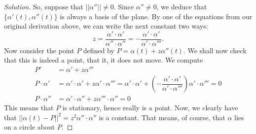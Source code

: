 \documentclass[Shifrin_Solutions_Spring_2015]{subfiles}
\begin{document}
\begin{proof}[Solution]
So, suppose that $||\alpha''||\neq 0$. Since $\alpha'' \neq 0$, we deduce that $\{ \alpha'(t), \alpha''(t) \}$ is always a basis of the plane.
By one of the equations from our original derivation above, we can write the next constant two ways:
\[
z = \dfrac{\alpha'\cdot \alpha'}{\alpha''\cdot\alpha''} = - \dfrac{\alpha'\cdot \alpha'}{\alpha' \cdot \alpha'''} .
\]
Now consider the point $P$ defined by $ P = \alpha(t) + z \alpha''(t)$. We shall now check that this is indeed a point, that it, it does not move.
We compute
\begin{align*}
P'  & = \alpha' + z \alpha''' \\
P \cdot \alpha'& = \alpha' \cdot \alpha' + z \alpha' \cdot \alpha''' = \alpha' \cdot \alpha' + \left( - \dfrac{\alpha'\cdot \alpha'}{\alpha' \cdot \alpha'''} \right) \alpha' \cdot \alpha''' = 0 \\
P \cdot \alpha'' &  = \alpha' \cdot \alpha'' + z \alpha'''\cdot \alpha'' = 0
\end{align*}
This means that $P$ is stationary, hence really is a point. Now, we clearly have that $||\alpha(t) - P ||^2 = z^2 \alpha'' \cdot \alpha'' $ is a constant. That means, of course, that $\alpha$ lies on a circle about $P$.
\end{proof}


\vfill
\end{document}
